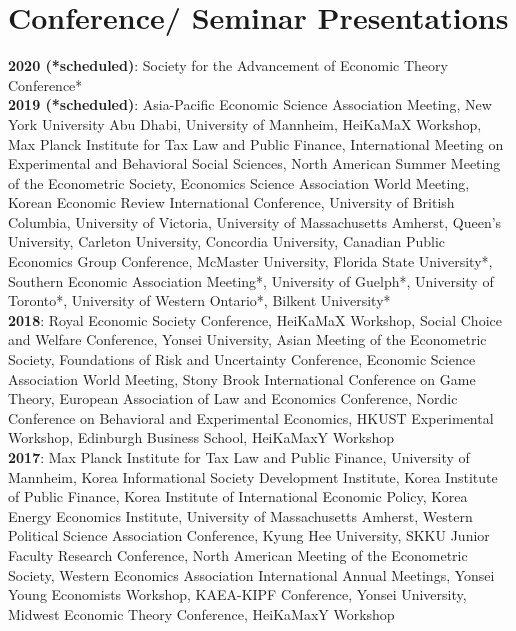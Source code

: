 \documentclass[margin, letterpaper]{res}
\begin{document}
\begin{resume}
\begin{itemize}
\end{itemize}

\section{Conference/ Seminar Presentations}
\textbf{2020 (*scheduled)}: Society for the Advancement of Economic Theory Conference*\\
\textbf{2019 (*scheduled)}: Asia-Pacific Economic Science Association Meeting, New York University Abu Dhabi, University of Mannheim, HeiKaMaX Workshop, Max Planck Institute for Tax Law and Public Finance, International Meeting on Experimental and Behavioral Social Sciences, North American Summer Meeting of the Econometric Society, Economics Science Association World Meeting, Korean Economic Review International Conference, University of British Columbia, University of Victoria, University of Massachusetts Amherst, Queen's University, Carleton University, Concordia University, Canadian Public Economics Group Conference, McMaster University, Florida State University*, Southern Economic Association Meeting*, University of Guelph*, University of Toronto*, University of Western Ontario*, Bilkent University*\\
\textbf{2018}: Royal Economic Society Conference, HeiKaMaX Workshop, Social Choice and Welfare Conference, Yonsei University, Asian Meeting of the Econometric Society, Foundations of Risk and Uncertainty Conference, Economic Science Association World Meeting, Stony Brook International Conference on Game Theory, European Association of Law and Economics Conference, Nordic Conference on Behavioral and Experimental Economics, HKUST Experimental Workshop, Edinburgh Business School, HeiKaMaxY Workshop\\
\textbf{2017}: Max Planck Institute for Tax Law and Public Finance, University of Mannheim, Korea Informational Society Development Institute, Korea Institute of Public Finance, Korea Institute of International Economic Policy, Korea Energy Economics Institute, University of Massachusetts Amherst, Western Political Science Association Conference, Kyung Hee University, SKKU Junior Faculty Research Conference, North American Meeting of the Econometric Society, Western Economics Association International Annual Meetings, Yonsei Young Economists Workshop, KAEA-KIPF Conference, Yonsei University, Midwest Economic Theory Conference, HeiKaMaxY Workshop\\

\end{resume}
\end{document}
